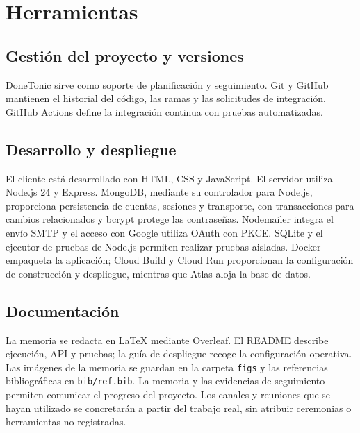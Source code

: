 \section{Herramientas}
\subsection{Gestión del proyecto y versiones}
DoneTonic sirve como soporte de planificación y seguimiento. Git y GitHub mantienen el historial del código, las ramas y las solicitudes de integración. GitHub Actions define la integración continua con pruebas automatizadas.
\subsection{Desarrollo y despliegue}
El cliente está desarrollado con HTML, CSS y JavaScript. El servidor utiliza Node.js 24 y Express. MongoDB, mediante su controlador para Node.js, proporciona persistencia de cuentas, sesiones y transporte, con transacciones para cambios relacionados y bcrypt protege las contraseñas. Nodemailer integra el envío SMTP y el acceso con Google utiliza OAuth con PKCE. SQLite y el ejecutor de pruebas de Node.js permiten realizar pruebas aisladas. Docker empaqueta la aplicación; Cloud Build y Cloud Run proporcionan la configuración de construcción y despliegue, mientras que Atlas aloja la base de datos.
\subsection{Documentación}
La memoria se redacta en LaTeX mediante Overleaf. El README describe ejecución, API y pruebas; la guía de despliegue recoge la configuración operativa. Las imágenes de la memoria se guardan en la carpeta \texttt{figs} y las referencias bibliográficas en \texttt{bib/ref.bib}.
La memoria y las evidencias de seguimiento permiten comunicar el progreso del proyecto. Los canales y reuniones que se hayan utilizado se concretarán a partir del trabajo real, sin atribuir ceremonias o herramientas no registradas.
